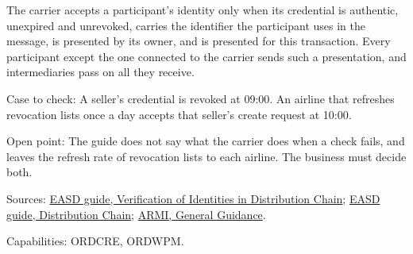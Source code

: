 \begin{definition}
  \label{def:order-creation-chain-identity-check}
  \notready
  The carrier accepts a participant's identity only when its credential is
  authentic, unexpired and unrevoked, carries the identifier the participant
  uses in the message, is presented by its owner, and is presented for this
  transaction. Every participant except the one connected to the carrier
  sends such a presentation, and intermediaries pass on all they receive.

  Case to check: A seller's credential is revoked at 09:00. An airline that
  refreshes revocation lists once a day accepts that seller's create request
  at 10:00.

  Open point: The guide does not say what the carrier does when a check
  fails, and leaves the refresh rate of revocation lists to each airline.
  The business must decide both.

  Sources: \href{https://standards.atlassian.net/wiki/spaces/EASD/pages/815464449/Verification+of+Identities+in+Distribution+Chain}{EASD guide, Verification of Identities in Distribution Chain};
  \href{https://standards.atlassian.net/wiki/spaces/EASD/pages/574488619/Distribution+Chain}{EASD guide, Distribution Chain};
  \href{https://standards.atlassian.net/wiki/spaces/ARMI/pages/584318980/General+Guidance}{ARMI, General Guidance}.

  Capabilities: ORDCRE, ORDWPM.
\end{definition}
